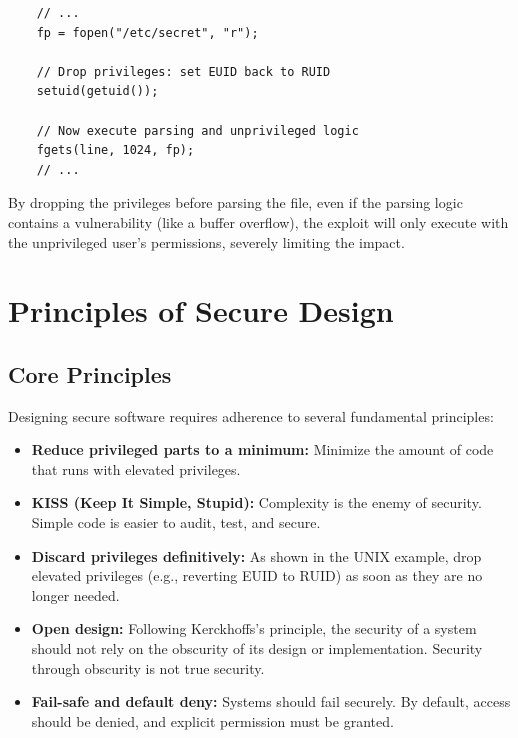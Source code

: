 \begin{verbatim}
    // ...
    fp = fopen("/etc/secret", "r");
    
    // Drop privileges: set EUID back to RUID
    setuid(getuid()); 
    
    // Now execute parsing and unprivileged logic
    fgets(line, 1024, fp);
    // ...
\end{verbatim}
By dropping the privileges before parsing the file, even if the parsing logic contains a vulnerability (like a buffer overflow), the exploit will only execute with the unprivileged user's permissions, severely limiting the impact.

\section{Principles of Secure Design}

\subsection{Core Principles}
Designing secure software requires adherence to several fundamental principles:
\begin{itemize}
    \item \textbf{Reduce privileged parts to a minimum:} Minimize the amount of code that runs with elevated privileges.
    \item \textbf{KISS (Keep It Simple, Stupid):} Complexity is the enemy of security. Simple code is easier to audit, test, and secure.
    \item \textbf{Discard privileges definitively:} As shown in the UNIX example, drop elevated privileges (e.g., reverting EUID to RUID) as soon as they are no longer needed.
    \item \textbf{Open design:} Following Kerckhoffs's principle, the security of a system should not rely on the obscurity of its design or implementation. Security through obscurity is not true security.
    \item \textbf{Fail-safe and default deny:} Systems should fail securely. By default, access should be denied, and explicit permission must be granted.
\end{itemize}

